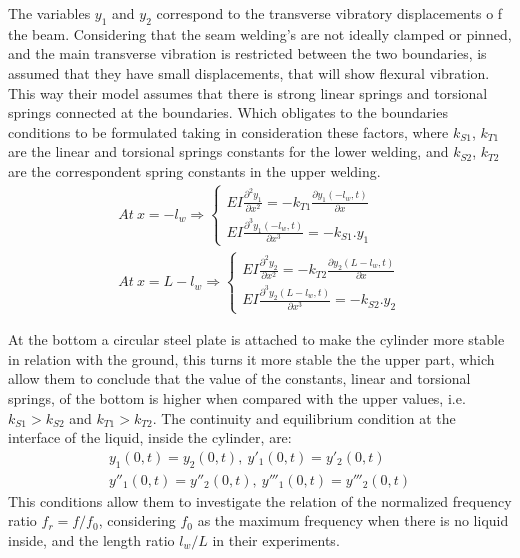 The variables $y_1$ and $y_2$ correspond to the transverse vibratory displacements o f the beam. Considering that the seam welding's are not ideally clamped or pinned, and the main transverse vibration is restricted between the two boundaries, is assumed that they have small displacements, that will show flexural vibration. This way their model assumes that there is strong linear springs and torsional springs connected at the boundaries. Which obligates to the boundaries conditions to be formulated taking in consideration these factors, where $k_{S1}$, $k_{T1}$ are the linear and torsional springs constants for the lower welding, and $k_{S2}$, $k_{T2}$ are the correspondent spring constants in the upper welding.
\begin{equation} \label{eq:beamEqEv}
    \begin{split}
        At\>x=-l_w \Rightarrow \begin{cases}
            EI\frac{\partial^2y_1}{\partial x^2} = -k_{T1}\frac{\partial y_1(-l_w,t)}{\partial x}\\
            EI\frac{\partial^3y_1(-l_w,t)}{\partial x^3}=-k_{S1}.y_1    
        \end{cases}\\
        At\>x=L-l_w \Rightarrow \begin{cases}
            EI\frac{\partial^2y_2}{\partial x^2} = -k_{T2}\frac{\partial y_2(L-l_w,t)}{\partial x}\\
            EI\frac{\partial^3y_2(L-l_w,t)}{\partial x^3}=-k_{S2}.y_2    
        \end{cases}    
    \end{split}
\end{equation}

At the bottom a circular steel plate is attached to make the cylinder more stable in relation with the ground, this turns it more stable the the upper part, which allow them to conclude that the value of the constants, linear and torsional springs, of the bottom is higher when compared with the upper values, i.e. $k_{S1}>k_{S2}$ and $k_{T1}>k_{T2}$. The continuity and equilibrium condition at the interface of the liquid, inside the cylinder, are:
\begin{equation} \label{eq:beamEqEquilCond}
    \begin{split}
        y_1(0,t) = y_2(0,t),\> y'_1(0,t) = y'_2(0,t) \\
        y''_1(0,t) = y''_2(0,t),\> y'''_1(0,t) = y'''_2(0,t)
    \end{split}
\end{equation}
This conditions allow them to investigate the relation of the normalized frequency ratio $f_r=f/f_0$, considering $f_0$ as the maximum frequency when there is no liquid inside, and the length ratio $l_w/L$ in their experiments.

